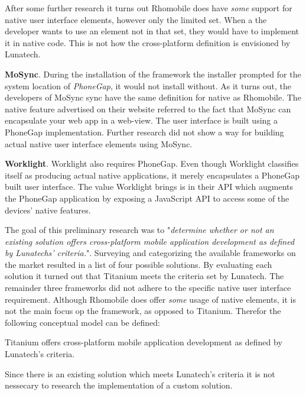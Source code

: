After some further research it turns out Rhomobile does have \emph{some} support for native user interface elements, however only the limited set. When a the developer wants to use an element not in that set, they would have to implement it in native code.\cite{Rhomobile2012} This is not how the cross-platform definition is envisioned by Lunatech.

{\bf MoSync}. During the installation of the framework the installer prompted for the system location of \emph{PhoneGap}, it would not install without. As it turns out, the developers of MoSync sync have the same definition for native as Rhomobile. The native feature advertised on their website referred to the fact that MoSync can encapsulate your web app in a web-view. The user interface is built using a PhoneGap implementation. Further research did not show a way for building actual native user interface elements using MoSync.

{\bf Worklight}. Worklight also requires PhoneGap. Even though Worklight classifies itself as producing actual native applications, it merely encapsulates a PhoneGap built user interface. The value Worklight brings is in their API which augments the PhoneGap application by exposing a JavaScript API to access some of the devices' native features.

The goal of this preliminary research was to "\emph{determine whether or not an existing solution offers cross-platform mobile application development as defined by Lunatechs' criteria.}".  Surveying and categorizing the available frameworks on the market resulted in a list of four possible solutions. By evaluating each solution it turned out that Titanium meets the criteria set by Lunatech. The remainder three frameworks did not adhere to the specific native user interface requirement. Although Rhomobile does offer \emph{some} usage of native elements, it is not the main focus op the framework, as opposed to Titanium. Therefor the following conceptual model can be defined:
\begin{shadequote}
Titanium offers cross-platform mobile application development as defined by Lunatech's criteria.%
\end{shadequote}

Since there is an existing solution which meets Lunatech's criteria it is not nessecary to research the implementation of a custom solution.%